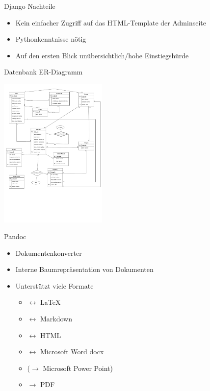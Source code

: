 \documentclass[english,hangout]{beamer}
\begin{document}
\begin{frame}{Django Nachteile}
\begin{itemize}
 \item Kein einfacher Zugriff auf das HTML-Template der Adminseite
 \item Pythonkenntnisse nötig
 \item Auf den ersten Blick unübersichtlich/hohe Einstiegshürde
\end{itemize}
\end{frame}

\begin{frame}{Datenbank ER-Diagramm}
 \begin{center}
\includegraphics[height=7.5cm]{dynexgen-erd.pdf}
\end{center}
\vspace{-6mm}
\end{frame}

\begin{frame}{Pandoc}
    \begin{itemize}
        \item Dokumentenkonverter
        \item Interne Baumrepräsentation von Dokumenten
        \item Unterstützt viele Formate
        \begin{itemize}
            \item $\leftrightarrow$ \LaTeX
            \item $\leftrightarrow$ Markdown
            \item $\leftrightarrow$ HTML
            \item $\leftrightarrow$ Microsoft Word docx
            \item ($\rightarrow$ Microsoft Power Point)
            \item $\rightarrow$ PDF
        \end{itemize}
    \end{itemize}
\end{frame}
\end{document}
